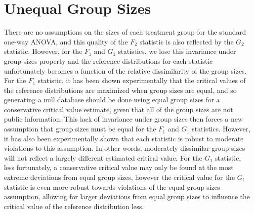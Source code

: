 \section{Unequal Group Sizes}

There are no assumptions on the sizes of each treatment group for the standard one-way ANOVA, and this quality of the $F_2$ statistic is also reflected by the $G_2$ statistic. However, for the $F_1$ and $G_1$ statistics, we lose this invariance under group sizes property and the reference distributions for each statistic unfortunately becomes a function of the relative dissimilarity of the group sizes. For the $F_1$ statistic, it has been shown experimentally that the critical values of the reference distributions are maximized when group sizes are equal, and so generating a null database should be done using equal group sizes for a conservative critical value estimate, given that all of the group sizes are not public information.  This lack of invariance under group sizes then forces a new assumption that group sizes must be equal for the $F_1$ and $G_1$ statistics. However, it has also been experimentally shown that each statistic is  robust to moderate violations to this assumption. In other words, moderately dissimilar group sizes will not reflect a largely different estimated critical value. For the $G_1$ statistic, less fortunately, a conservative critical value may only be found at the most extreme deviations from equal group sizes, however the critical value for the $G_1$ statistic is even more robust towards violations of the equal group sizes assumption, allowing for larger deviations from equal group sizes to influence the critical value of the reference distribution less.